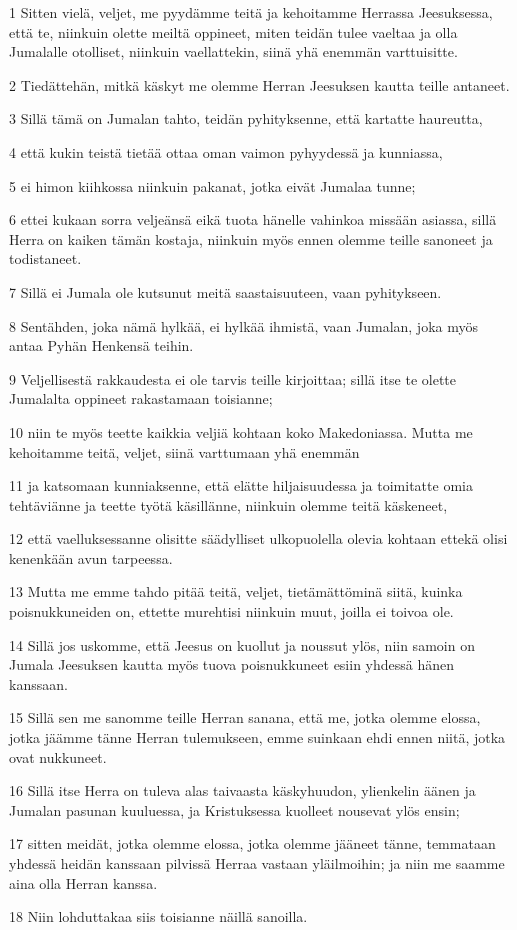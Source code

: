 \par 1 Sitten vielä, veljet, me pyydämme teitä ja kehoitamme Herrassa Jeesuksessa, että te, niinkuin olette meiltä oppineet, miten teidän tulee vaeltaa ja olla Jumalalle otolliset, niinkuin vaellattekin, siinä yhä enemmän varttuisitte.
\par 2 Tiedättehän, mitkä käskyt me olemme Herran Jeesuksen kautta teille antaneet.
\par 3 Sillä tämä on Jumalan tahto, teidän pyhityksenne, että kartatte haureutta,
\par 4 että kukin teistä tietää ottaa oman vaimon pyhyydessä ja kunniassa,
\par 5 ei himon kiihkossa niinkuin pakanat, jotka eivät Jumalaa tunne;
\par 6 ettei kukaan sorra veljeänsä eikä tuota hänelle vahinkoa missään asiassa, sillä Herra on kaiken tämän kostaja, niinkuin myös ennen olemme teille sanoneet ja todistaneet.
\par 7 Sillä ei Jumala ole kutsunut meitä saastaisuuteen, vaan pyhitykseen.
\par 8 Sentähden, joka nämä hylkää, ei hylkää ihmistä, vaan Jumalan, joka myös antaa Pyhän Henkensä teihin.
\par 9 Veljellisestä rakkaudesta ei ole tarvis teille kirjoittaa; sillä itse te olette Jumalalta oppineet rakastamaan toisianne;
\par 10 niin te myös teette kaikkia veljiä kohtaan koko Makedoniassa. Mutta me kehoitamme teitä, veljet, siinä varttumaan yhä enemmän
\par 11 ja katsomaan kunniaksenne, että elätte hiljaisuudessa ja toimitatte omia tehtäviänne ja teette työtä käsillänne, niinkuin olemme teitä käskeneet,
\par 12 että vaelluksessanne olisitte säädylliset ulkopuolella olevia kohtaan ettekä olisi kenenkään avun tarpeessa.
\par 13 Mutta me emme tahdo pitää teitä, veljet, tietämättöminä siitä, kuinka poisnukkuneiden on, ettette murehtisi niinkuin muut, joilla ei toivoa ole.
\par 14 Sillä jos uskomme, että Jeesus on kuollut ja noussut ylös, niin samoin on Jumala Jeesuksen kautta myös tuova poisnukkuneet esiin yhdessä hänen kanssaan.
\par 15 Sillä sen me sanomme teille Herran sanana, että me, jotka olemme elossa, jotka jäämme tänne Herran tulemukseen, emme suinkaan ehdi ennen niitä, jotka ovat nukkuneet.
\par 16 Sillä itse Herra on tuleva alas taivaasta käskyhuudon, ylienkelin äänen ja Jumalan pasunan kuuluessa, ja Kristuksessa kuolleet nousevat ylös ensin;
\par 17 sitten meidät, jotka olemme elossa, jotka olemme jääneet tänne, temmataan yhdessä heidän kanssaan pilvissä Herraa vastaan yläilmoihin; ja niin me saamme aina olla Herran kanssa.
\par 18 Niin lohduttakaa siis toisianne näillä sanoilla.

